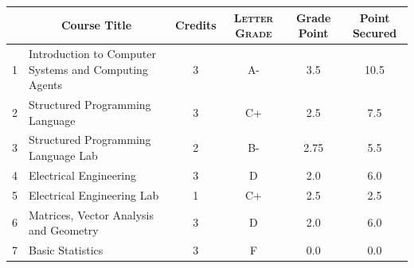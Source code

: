 \documentclass[11pt]{article}
\newcommand*{\numtwo}[1]{\pgfmathprintnumber[
                    fixed, precision=2, fixed zerofill=true]{#1}}
\begin{document}
                \begin{center}
                    \renewcommand{\arraystretch}{1.08}
                    
                \begin{tabular}{|c|l|c|>{\scshape}c|c|c|}
                \hline  \rule[-1ex]{0pt}{3.5ex} {\centering{\bf Course Code}} &  \multicolumn{1}{c|}{\textbf{Course Title}}  & {\bf Credits} & {\bf Letter Grade} & {\bf Grade Point} & {\bf Point Secured}  \\ 
                \hline   1 &  Introduction to Computer Systems and Computing Agents		 & 3 & A- & 3.5 & 10.5 \\ %
                \hline   2 &  Structured Programming Language		 & 3 & C+ & 2.5 & 7.5 \\ %
                \hline   3 &  Structured Programming Language Lab		 & 2 & B- & 2.75 & 5.5 \\ %
                \hline   4 &  Electrical Engineering		 & 3 & D & 2.0 & 6.0 \\ %
                \hline   5 &  Electrical Engineering Lab		 & 1 & C+ & 2.5 & 2.5 \\ %
                \hline   6 &  Matrices, Vector Analysis and Geometry		 & 3 & D & 2.0 & 6.0 \\ %
                \hline   7 &  Basic Statistics		 & 3 & F & 0.0 & 0.0 \\ %

\hline                %
                \end{tabular}
                \end{center}
                \renewcommand{\arraystretch}{1.03}
\end{document}
